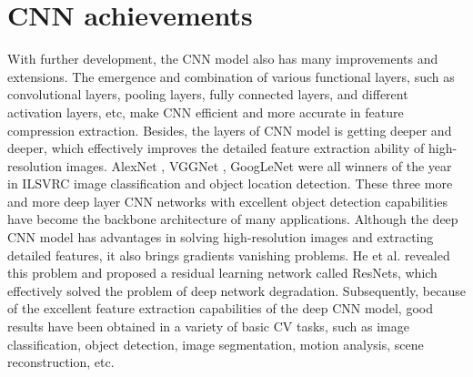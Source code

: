 \documentclass[10pt, a4paper]{IEEEtran} %
\begin{document}
	\section{CNN achievements} %
	With further development, the CNN model also has many improvements and extensions. The emergence and combination of various functional layers, such as convolutional layers, pooling layers, fully connected layers, and different activation layers, etc, make CNN efficient and more accurate in feature compression extraction. Besides, the layers of CNN model is getting deeper and deeper, which effectively improves the detailed feature extraction ability of high-resolution images. AlexNet \cite{krizhevsky2017imagenet}, VGGNet \cite{simonyan2014very}, GoogLeNet \cite{szegedy2015going} were all winners of the year in ILSVRC image classification and object location detection. These three more and more deep layer CNN networks with excellent object detection capabilities have become the backbone architecture of many applications. Although the deep CNN model has advantages in solving high-resolution images and extracting detailed features, it also brings gradients vanishing problems. He et al. \cite{he2016deep} revealed this problem and proposed a residual learning network called ResNets, which effectively solved the problem of deep network degradation. Subsequently, because of the excellent feature extraction capabilities of the deep CNN model, good results have been obtained in a variety of basic CV tasks, such as image classification, object detection, image segmentation, motion analysis, scene reconstruction, etc. 
	\par
\end{document}
